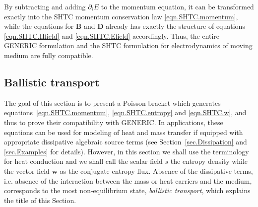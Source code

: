 \documentclass[twoside]{article}
\newcommand{\rr}{{\boldsymbol{r}}}
\newcommand{\ww}{{\boldsymbol{w}}}
\newcommand{\mm}{{\boldsymbol{m}}}
\newcommand{\DD}{{\boldsymbol{D}}}
\newcommand{\BB}{{\boldsymbol{B}}}
\newcommand{\pd}{\partial}
\newcommand{\IP}[1]{ \textcolor{blue}   {\small\texttt{
\texttt{[image: pin\_small.jpeg]} Ilya: #1}} }
\newcommand{\MP}[1]{ \textcolor{Green}   {\small\texttt{
\texttt{[image: pin\_small.jpeg]} Michal: #1}} }
\newcommand{\eps}{\varepsilon}
\begin{document}
By subtracting and adding $ \pd_i E $  to the momentum equation, it can be 
transformed exactly into the SHTC momentum conservation law 
\eqref{eqn.SHTC.momentum}, while the equations for $ \BB $ and $ \DD $ already 
has exactly the structure of equations \eqref{eqn.SHTC.Hfield} and 
\eqref{eqn.SHTC.Efield} accordingly.
Thus, the entire GENERIC formulation 
and the SHTC formulation for electrodynamics of moving medium are fully 
compatible.

%
%

\subsection{Ballistic transport}


The goal of this section is to present a Poisson bracket which 
generates equations~\eqref{eqn.SHTC.momentum}, \eqref{eqn.SHTC.entropy} and 
\eqref{eqn.SHTC.w}, and thus to prove their compatibility with GENERIC. In 
applications, these equations can be used for modeling of heat and mass 
transfer if equipped with appropriate dissipative algebraic source terms (see 
Section~\ref{sec.Dissipation} and \ref{sec.Examples} for details). However, in 
this section we shall use the terminology for heat conduction and we shall call 
the scalar field $ s $ the entropy density while the vector field $ \ww $ as 
the 
conjugate entropy flux. Absence 
of the dissipative terms, i.e. absence of the interaction between the mass or 
heat carriers and the medium, corresponds to the most non-equilibrium state, 
\textit{ballistic transport}, which explains the title of this Section.
\end{document}

